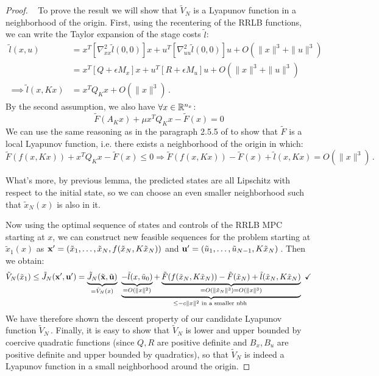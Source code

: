 \documentclass[12pt]{article}
\begin{document}
\begin{proof}~
	To prove the result we will show that $\tilde{V}_N$ is a Lyapunov function in a neighborhood of the origin.
	First, using the recentering of the RRLB functions, we can write the Taylor expansion of the stage costs $\tilde{l}$:
	\begin{align*}
		\tilde{l}(x,u)&=x^T[\nabla_{xx}^2\tilde{l}(0,0)] x+u^T[\nabla_{uu}^2\tilde{l}(0,0)]u+O(\|x\|^3+\|u\|^3)\\
		&=x^T[Q+\epsilon M_x]x+u^T[R+\epsilon M_u]u+O(\|x\|^3+\|u\|^3)\\
		\implies\tilde{l}(x,Kx)&=x^TQ_Kx+O(\|x\|^3)\,.
	\end{align*}
	By the second assumption, we also have $\forall x\in\R^{n_x}$:
	$$\tilde{F}(A_Kx)+\mu x^T Q_K x-\tilde{F}(x)=0$$
	We can use the same reasoning as in the paragraph 2.5.5 of \cite{MPC-book} to show that $\tilde{F}$ is a local Lyapunov function, i.e. there exists a neighborhood of the origin in which:
	$$\tilde{F}(f(x,Kx))+x^T Q_K x-\tilde{F}(x)\leq 0\Longrightarrow\tilde{F}(f(x,Kx))-\tilde{F}(x)+\tilde{l}(x,Kx)=O(\|x\|^3)\,.$$

	\noindent What's more, by previous lemma, the predicted states are all Lipschitz with respect to the initial state, so we can choose an even smaller neighborhood such that $\tilde{x}_N(x)$ is also in it.

	\noindent Now using the optimal sequence of states and controls of the RRLB MPC starting at $x$, we can construct new feasible sequences for the problem starting at $\tilde{x}_1(x)$ as \newline
	$\bf{x}'=(\tilde{x}_1,\ldots,\tilde{x}_N,f(\tilde{x}_N,K\tilde{x}_N))$ and $\bf{u}'=(\tilde{u}_1,\ldots,\tilde{u}_{N-1},K\tilde{x}_N)$\,.
	Then we obtain:
	$$\tilde{V}_N(\tilde{x}_1)\leq\tilde{J}_N(\bf{x}',\bf{u}')=\underbrace{\tilde{J}_N(\tilde{\bf{x}},\tilde{\bf{u}})}_{=\tilde{V}_N(x)}~\underbrace{\underbrace{-\tilde{l}(x,\tilde{u}_0)}_{=O(\|x\|^2)}+\underbrace{\tilde{F}(f(\tilde{x}_N,K\tilde{x}_N))-\tilde{F}(\tilde{x}_N)+\tilde{l}(\tilde{x}_N,K\tilde{x}_N) }_{=O(\|\tilde{x}_N\|^3)=O(\|x\|^3)} }_{\leq-c\|x\|^2\text{ in a smaller nbh }}~\checkmark$$
	We have therefore shown the descent property of our candidate Lyapunov function $\tilde{V}_N$\,.
	Finally, it is easy to show that $\tilde{V}_N$ is lower and upper bounded by coercive quadratic functions (since $Q,R$ are positive definite and $B_x,B_u$ are positive definite and upper bounded by quadratics), so that $\tilde{V}_N$ is indeed a Lyapunov function in a small neighborhood around the origin.
\end{proof}
\end{document}
